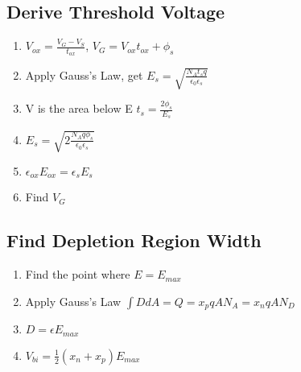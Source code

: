 \documentclass{article}
\begin{document}
   \subsection{Derive Threshold Voltage}
   \begin{enumerate}
     \item $V_{ox} = \frac{V_G - V_{S}}{t_{ox}}$, $V_G = V_{ox}t_{ox} + \phi_s$
     \item Apply Gauss's Law, get $E_s =\sqrt{ \frac{N_At_sq}{\epsilon_0\epsilon_s}}$ 
     \item V is the area below E $t_s = \frac{2\phi_s}{E_s}$
     \item $E_s =\sqrt{ 2\frac{N_Aq\phi_s}{\epsilon_0\epsilon_s}}$ 
     \item $\epsilon_{ox}E_{ox} = \epsilon_{s}E_s$
     \item Find $V_G$
   \end{enumerate}
   
   \subsection{Find Depletion Region Width}
   \begin{enumerate}
     \item Find the point where $E = E_{max}$
     \item Apply Gauss's Law $\int DdA = Q = x_pqAN_A = x_nqAN_D$
     \item $D = \epsilon E_{max}$
     \item $V_{bi} = \frac{1}{2}(x_n + x_p)E_{max}$
   \end{enumerate}
   
\end{document}
